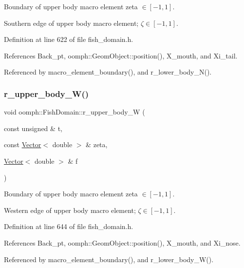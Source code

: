 Boundary of upper body macro element zeta $ \in [-1,1] $. 

Southern edge of upper body macro element; $ \zeta \in [-1,1] $. 

Definition at line 622 of file fish\+\_\+domain.\+h.



References Back\+\_\+pt, oomph\+::\+Geom\+Object\+::position(), X\+\_\+mouth, and Xi\+\_\+tail.



Referenced by macro\+\_\+element\+\_\+boundary(), and r\+\_\+lower\+\_\+body\+\_\+\+N().

\mbox{\label{classoomph_1_1FishDomain_ac0fadb2212e194bfe9f2ff7f0c892c22}} 
\subsubsection{\texorpdfstring{r\+\_\+upper\+\_\+body\+\_\+\+W()}{r\_upper\_body\_W()}}
{\footnotesize\ttfamily void oomph\+::\+Fish\+Domain\+::r\+\_\+upper\+\_\+body\+\_\+W (\begin{DoxyParamCaption}\item[{const unsigned \&}]{t,  }\item[{const \hyperlink{classoomph_1_1Vector}{Vector}$<$ double $>$ \&}]{zeta,  }\item[{\hyperlink{classoomph_1_1Vector}{Vector}$<$ double $>$ \&}]{f }\end{DoxyParamCaption})\hspace{0.3cm}{\ttfamily [private]}}



Boundary of upper body macro element zeta $ \in [-1,1] $. 

Western edge of upper body macro element; $ \zeta \in [-1,1] $. 

Definition at line 644 of file fish\+\_\+domain.\+h.



References Back\+\_\+pt, oomph\+::\+Geom\+Object\+::position(), X\+\_\+mouth, and Xi\+\_\+nose.



Referenced by macro\+\_\+element\+\_\+boundary(), and r\+\_\+lower\+\_\+body\+\_\+\+W().

